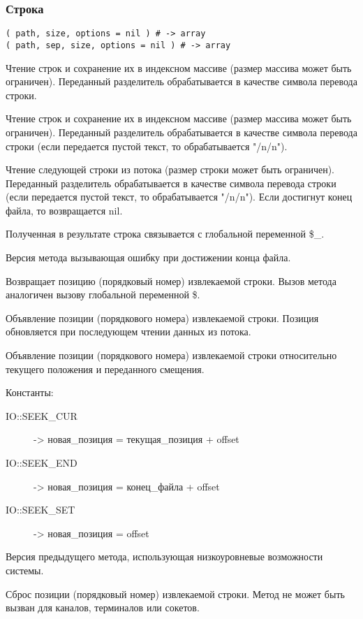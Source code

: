 \subsubsection*{Строка}

\begin{methodlist}
  \verb!( path, size, options = nil ) # -> array!
  \\\verb!( path, sep, size, options = nil ) # -> array!
  
  Чтение строк и сохранение их в индексном массиве (размер массива может быть ограничен). Переданный разделитель обрабатывается в качестве символа перевода строки.
 
  Чтение строк и сохранение их в индексном массиве (размер массива может быть ограничен). Переданный разделитель обрабатывается в качестве символа перевода строки (если передается пустой текст, то обрабатывается "/n/n").
   
  Чтение следующей строки из потока (размер строки может быть ограничен). Переданный разделитель обрабатывается в качестве символа перевода строки (если передается пустой текст, то обрабатывается "/n/n"). Если достигнут конец файла, то возвращается nil.

  Полученная в результате строка связывается с глобальной переменной \$_. 
 
  Версия метода вызывающая ошибку при достижении конца файла. 
 
  Возвращает позицию (порядковый номер) извлекаемой строки. Вызов метода аналогичен вызову глобальной переменной \$. 
 
  Объявление позиции (порядкового номера) извлекаемой строки. Позиция обновляется при последующем чтении данных из потока.  
 
  Объявление позиции (порядкового номера) извлекаемой строки относительно текущего положения и переданного смещения.

  Константы:
  \begin{description}
    \item[IO::SEEK_CUR] -> новая_позиция = текущая_позиция + offset
    \item[IO::SEEK_END] -> новая_позиция = конец_файла + offset
    \item[IO::SEEK_SET] -> новая_позиция = offset
  \end{description}   
 
  Версия предыдущего метода, использующая низкоуровневые возможности системы.

  Сброс позиции (порядковый номер) извлекаемой строки. Метод не может быть вызван для каналов, терминалов или сокетов. 
\end{methodlist}

